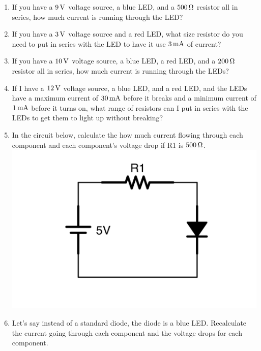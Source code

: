 \begin{enumerate}
\item If you have a $9\,\si{\volt}$ voltage source, a blue LED, and a $500\,\si{\ohm}$ resistor all in series, how much current is running through the LED?
\item If you have a $3\,\si{\volt}$ voltage source and a red LED, what size resistor do you need to put in series with the LED to have it use $3\,\si{\milli\ampere}$ of current?
\item If you have a $10\,\si{\volt}$ voltage source, a blue LED, a red LED, and a $200\,\si{\ohm}$ resistor all in series, how much current is running through the LEDs?
\item If I have a $12\,\si{\volt}$ voltage source, a blue LED, and a red LED, and the LEDs have a maximum current of $30\,\si{\milli\ampere}$ before it breaks and a minimum current of $1\,\si{\milli\ampere}$ before it turns on, what range of resistors can I put in series with the LEDs to get them to light up without breaking?
\item In the circuit below, calculate the how much current flowing through each component and each component's voltage drop if R1 is $500\,\si{\ohm}$. \\ \includegraphics[scale=0.08]{DiodeApplyEx1.png}
\item Let's say instead of a standard diode, the diode is a blue LED.  Recalculate the current going through each component and the voltage drops for each component.

\end{enumerate}
